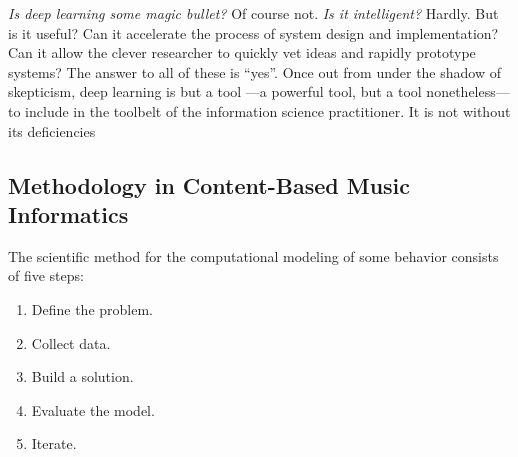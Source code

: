 \begin{figure}
\begin{centering}
\texttt{[image: deephype]}
\caption{\emph{Gartner Hype cycle of neural networks.}
\label{fig:deephype}
\end{centering}
\end{figure}

\emph{Is deep learning some magic bullet?}
Of course not.
\emph{Is it intelligent?}
Hardly.
But is it useful?
Can it accelerate the process of system design and implementation?
Can it allow the clever researcher to quickly vet ideas and rapidly prototype systems?
The answer to all of these is ``yes''.
Once out from under the shadow of skepticism, deep learning is but a tool ---a powerful tool, but a tool nonetheless--- to include in the toolbelt of the information science practitioner.
It is not without its deficiencies


\subsection{Methodology in Content-Based Music Informatics}


The scientific method for the computational modeling of some behavior consists of five steps:

\begin{enumerate}
\item Define the problem.
\item Collect data.
\item Build a solution.
\item Evaluate the model.
\item Iterate.
\end{enumerate}


